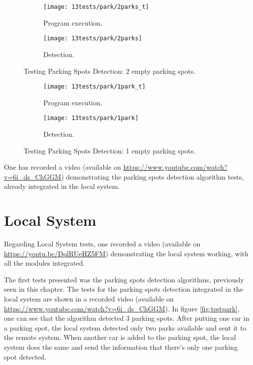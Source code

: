 \begin{figure}[H]
	\centering
	\begin{subfigure}{.5\textwidth}
		\centering
		\texttt{[image: 13tests/park/2parks\_t]}
		\caption{Program execution.}
		\label{fig:2parkst}
	\end{subfigure}%
	\begin{subfigure}{.4\textwidth}
		\centering
		\texttt{[image: 13tests/park/2parks]}
		\caption{Detection.}
		\label{fig:2parksim}
	\end{subfigure}
	\caption{Testing Parking Spots Detection: 2 empty parking spots.}
	\label{fig:2parks}
\end{figure}

\begin{figure}[H]
	\centering
	\begin{subfigure}{.5\textwidth}
		\centering
		\texttt{[image: 13tests/park/1park\_t]}
		\caption{Program execution.}
		\label{fig:1parkst}
	\end{subfigure}%
	\begin{subfigure}{.4\textwidth}
		\centering
		\texttt{[image: 13tests/park/1park]}
		\caption{Detection.}
		\label{fig:1parksim}
	\end{subfigure}
	\caption{Testing Parking Spots Detection: 1 empty parking spots.}
	\label{fig:1park}
\end{figure}

One has recorded a video (available on \url{https://www.youtube.com/watch?v=6i_ds_ChGGM}) demonstrating the parking spots detection algorithm tests, already integrated in the local system.


\section{Local System}
Regarding Local System tests, one recorded a video (available on \linebreak \url{https://youtu.be/DqlRUeHZ5FM}) demonstrating the local system working, with all the modules integrated.

The first tests presented was the parking spots detection algorithms, previously seen in this chapter. The tests for the parking spots detection integrated in the local system are shown in a recorded video (available on \url{https://www.youtube.com/watch?v=6i_ds_ChGGM}). In figure \ref{fig:testpark}, one can see that the algorithm detected 3 parking spots. After putting one car in a parking spot, the local system detected only two parks available and sent it to the remote system. When another car is added to the parking spot, the local system does the same and send the information that there's only one parking spot detected.

